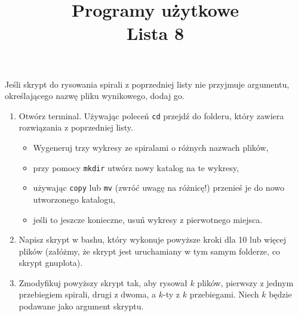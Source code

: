 \documentclass[12pt, letterpaper]{article}
\title{Programy użytkowe \\ Lista 8}
\date{}
\begin{document}
\maketitle
Jeśli skrypt do rysowania spirali z poprzedniej listy nie przyjmuje argumentu, określającego nazwę pliku wynikowego, dodaj go.
\begin{enumerate}
    \item Otwórz terminal. Używając poleceń \texttt{cd} przejdź do folderu, który zawiera rozwiązania z poprzedniej listy.
    \begin{itemize}
        \item Wygeneruj trzy wykresy ze spiralami o różnych nazwach plików,
        \item przy pomocy \texttt{mkdir} utwórz nowy katalog na te wykresy,
        \item używając \texttt{copy} lub \texttt{mv} (zwróć uwagę na różnicę!) przenieś je do nowo utworzonego katalogu,
        \item jeśli to jeszcze konieczne, usuń wykresy z pierwotnego miejsca.
    \end{itemize}
    \item Napisz skrypt w bashu, który wykonuje powyższe kroki dla 10 lub więcej plików (załóżmy, że skrypt jest uruchamiany w tym samym folderze, co skrypt gnuplota).
    \item Zmodyfikuj powyższy skrypt tak, aby rysował $k$ plików, pierwszy z jednym przebiegiem spirali, drugi z dwoma, a $k$-ty z $k$ przebiegami. Niech $k$ będzie podawane jako argument skryptu.
\end{enumerate}
\end{document}
